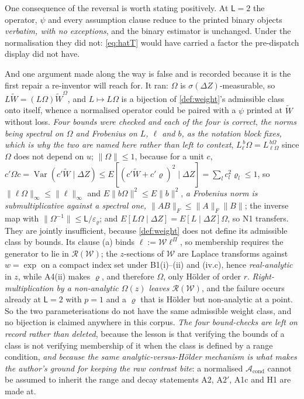 One consequence of the reversal is worth stating positively. At $\mathsf L=2$ the operator, $\psi$
and every assumption clause reduce to the printed binary objects \emph{verbatim, with no exceptions}, and
the binary estimator is unchanged. Under the normalisation they did not: \eqref{eq:hatT} would have
carried a factor the pre-dispatch display did not have.

And one argument made along the way is false and is recorded because it is the first repair a
re-inventor will reach for. It ran: $\Omega$ is $\sigma(\Delta Z)$-measurable,
so $L\widetilde W=(L\Omega)\widetilde W^{\Omega}$, and $L\mapsto L\Omega$ is a bijection of
\cref{def:weight}'s admissible class onto itself, whence a normalised operator could be paired with a
$\psi$ printed at $\widetilde W$
without loss. \emph{Four bounds were checked and each of the four is correct}, \emph{the norms being spectral on
$\Omega$ and Frobenius on $L$, $\ell$ and $b$, as the notation block fixes, which is why the two are
named here rather than left to context}, 
$L^{\,b}_{\ell}\Omega=L^{\,b\Omega}_{\ell\Omega}$ since $\Omega$ does not depend on $u$;
$\|\Omega\|\le1$, because for a unit $c$, $c'\Omega c=\operatorname{Var}(c'\widetilde W\mid\Delta Z)\le
E[(c'\widetilde W+c'\varrho)^{2}\mid\Delta Z]=\sum_lc_l^{2}\varrho_l\le1$, so
$\|\ell\Omega\|_\infty\le\|\ell\|_\infty$ and $E\|b\Omega\|^{2}\le E\|b\|^{2}$, \emph{a Frobenius
norm is submultiplicative against a spectral one, $\|AB\|_F\le\|A\|_F\|B\|$}; the inverse map with
$\|\Omega^{-1}\|\le\mathsf L/\varepsilon_\varrho$; and $E[L\Omega\mid\Delta Z]=E[L\mid\Delta Z]\Omega$,
so N1 transfers. They are jointly insufficient, because \cref{def:weight} does not define its
admissible class by bounds. Its clause (a) binds $\ell:=\mathcal W\ell^\Pi$, so membership requires the
generator to lie in $\mathcal R(\mathcal W)$; the $z$-sections of $\mathcal W$ are Laplace transforms
against $w=\exp$ on a compact index set under B1(i)--(ii) and (iv.c), hence \emph{real-analytic} in $z$,
while A4(ii) makes $\varrho$, and therefore $\Omega$, only H\"older of order $r$.
\emph{Right-multiplication by a non-analytic $\Omega(z)$ leaves $\mathcal R(\mathcal W)$}, and the
failure occurs already at $\mathsf L=2$ with $p=1$ and a $\varrho$ that is H\"older but non-analytic at a
point. So the two parameterisations do not have the same admissible weight class, and no bijection
is claimed anywhere in this corpus. \emph{The four bound-checks are left on record rather than deleted},
because the lesson is that verifying the bounds of a class is not verifying membership of it when the
class is defined by a range condition, \emph{and because the same analytic-versus-H\"older mechanism
is what makes the author's ground for keeping the raw contrast bite}: a normalised
$\mathcal A_{\mathrm{cond}}$ cannot be assumed to inherit the range and decay statements A2, A$2'$, A1c
and H1 are made at.

